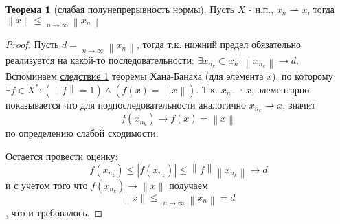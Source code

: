 \documentclass[12pt,a4paper]{article}
\theoremstyle{definition}
\newtheorem{theorem}{Теорема}
\newcommand{\norm}[1]{\left\lVert#1\right\rVert}
\DeclareMathOperator*\lowlim{\underline{lim}}
\newcommand{\weakto}{\rightharpoonup}
\begin{document}
\begin{theorem}[слабая полунепрерывность нормы]
	Пусть $X$ - н.п., $x_n \weakto x$, тогда $\norm{x} \leq \lowlim\limits_{n \to \infty}{\norm{x_n}}$
\end{theorem}
\begin{proof}
	Пусть $d = \lowlim\limits_{n \to \infty}{\norm{x_n}}$, тогда т.к. нижний предел обязательно реализуется на какой-то последовательности: $\exists{x_{n_k}} \subset{x_n}: \norm{x_{n_k}} \to d$. Вспоминаем \hyperref[corll:1]{следствие 1} теоремы Хана-Банаха (для элемента $x$), по которому \\ $\exists f \in X^*: (\norm{f} = 1) \wedge (f(x) = \norm{x})$. Т.к. $x_n \weakto x$, элементарно показывается что для подпоследовательности аналогично $x_{n_k} \weakto x$, значит 
	$$f(x_{n_k}) \to f(x) = \norm{x}$$
	по определению слабой сходимости.
	
	Остается провести оценку:
	$$f(x_{n_k}) \leq |f(x_{n_k})| \leq \norm{f} \norm{x_{n_k}} \to d$$
	и с учетом того что $f(x_{n_k}) \to \norm{x}$ получаем
	$$\norm{x} \leq \lowlim\limits_{n \to \infty}{\norm{x_n}} = d$$
	, что и требовалось.
\end{proof}
\newpage
\renewcommand{\listtheoremname}{Список теорем и утверждений}
\listoftheorems[ignoreall, show={theorem,corollary}]
\end{document}

